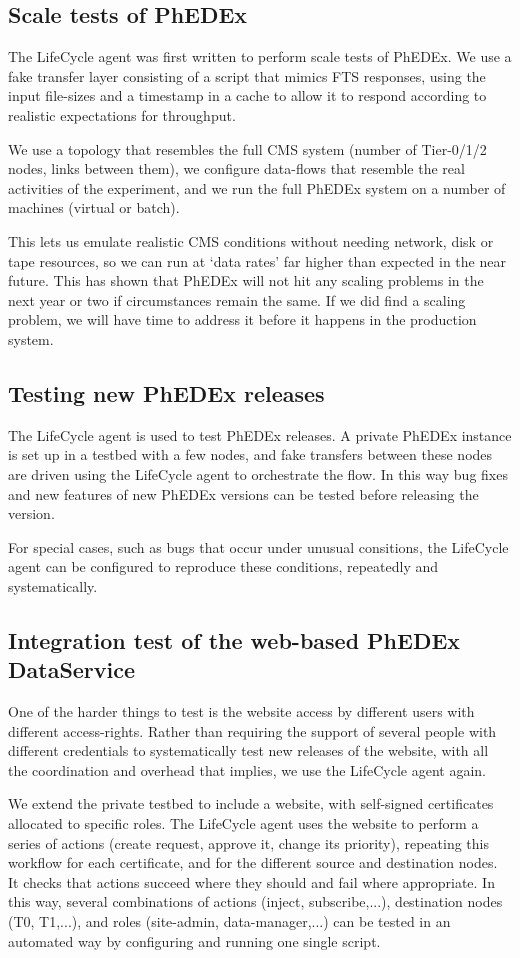 \subsection{Scale tests of PhEDEx}
The LifeCycle agent was first written to perform scale tests of PhEDEx. We use a fake transfer layer consisting of a script that mimics FTS responses, using the input file-sizes and a timestamp in a cache to allow it to respond according to realistic expectations for throughput.

We use a topology that resembles the full CMS system (number of Tier-0/1/2 nodes, links between them), we configure data-flows that resemble the real activities of the experiment, and we run the full PhEDEx system on a number of machines (virtual or batch).

This lets us emulate realistic CMS conditions without needing network, disk or tape resources, so we can run at `data rates' far higher than expected in the near future. This has shown that PhEDEx will not hit any scaling problems in the next year or two if circumstances remain the same. If we did find a scaling problem, we will have time to address it before it happens in the production system.

\subsection{Testing new PhEDEx releases}

The LifeCycle agent is used to test PhEDEx releases. A private PhEDEx instance is set up in a testbed with a few nodes, and fake transfers between these nodes are driven using the LifeCycle agent to orchestrate the flow. In this way bug fixes and new features of new PhEDEx versions can be tested before releasing the version. 

For special cases, such as bugs that occur under unusual consitions, the
LifeCycle agent can be configured to reproduce these conditions, repeatedly
and systematically.


\subsection{Integration test of the web-based PhEDEx DataService}

One of the harder things to test is the website access by different users
with different access-rights. Rather than requiring the support of several
people with different credentials to systematically test new releases of the website, with all the
coordination and overhead that implies, we use the LifeCycle agent again.

We extend the private testbed to include a website, with self-signed
certificates allocated to specific roles. The LifeCycle agent uses the website
to perform a series of actions (create request, approve it, change its
priority), repeating this workflow for each certificate, and for the different
source and destination nodes. It checks that actions succeed where they should
and fail where appropriate. In this way, several combinations of actions
(inject, subscribe,...), destination nodes (T0, T1,...), and roles
(site-admin, data-manager,...) can be tested in an automated way by
configuring and running one single script.

